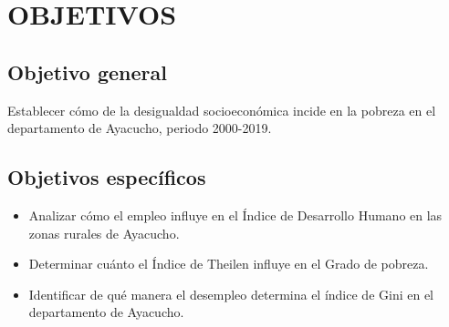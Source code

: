 \section{\large OBJETIVOS}

\subsection{Objetivo general}

Establecer cómo de la desigualdad socioeconómica incide en la pobreza en el departamento de Ayacucho, periodo 2000-2019.

\subsection{Objetivos específicos}

\begin{itemize}
\item Analizar cómo el empleo influye en el Índice de Desarrollo Humano en las zonas rurales de Ayacucho.
\item Determinar cuánto el Índice de Theilen influye en el Grado de pobreza.
\item Identificar de qué manera el desempleo determina el índice de Gini en el departamento de Ayacucho.

\end{itemize}


	
	
	


